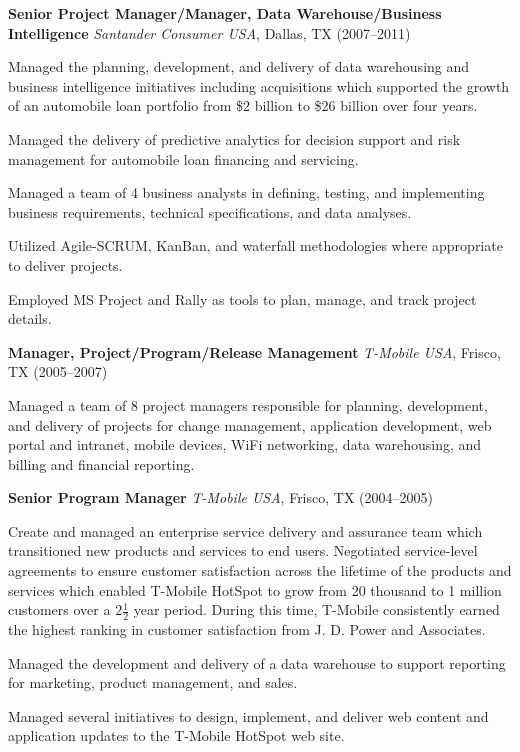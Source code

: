 \documentclass{article}
\newcommand{\sbt}{\,\begin{picture}(-1,1)(-1,-3)\circle*{3}\end{picture}\ }
\begin{document}
\clearpage

\noindent
{\bfseries Senior Project Manager/Manager, Data Warehouse/Business Intelligence} {\itshape Santander Consumer USA}, Dallas, TX (2007--2011)
\begin{compactitem}
\item[\sbt] Managed the planning, development, and delivery of data warehousing and business intelligence initiatives including acquisitions which supported the growth of an automobile loan portfolio from \$2 billion to \$26 billion over four years.
\item[\sbt] Managed the delivery of predictive analytics for decision support and risk management for automobile loan financing and servicing.
\item[\sbt] Managed a team of 4 business analysts in defining, testing, and implementing business requirements, technical specifications, and data analyses.
\item[\sbt] Utilized Agile-SCRUM, KanBan, and waterfall methodologies where appropriate to deliver projects.
\item[\sbt] Employed MS Project and Rally as tools to plan, manage, and track project details.
\end{compactitem}

\noindent
{\bfseries Manager, Project/Program/Release Management} {\itshape T-Mobile USA}, Frisco, TX (2005--2007)
\begin{compactitem}
\item[\sbt] Managed a team of 8 project managers responsible for planning, development, and delivery of projects for change management, application development, web portal and intranet, mobile devices, WiFi networking, data warehousing, and billing and financial reporting.
\end{compactitem}

\noindent
{\bfseries Senior Program Manager} {\itshape T-Mobile USA}, Frisco, TX (2004--2005)
\begin{compactitem}
\item[\sbt] Create and managed an enterprise service delivery and assurance team which transitioned new products and services to end users. Negotiated service-level agreements to ensure customer satisfaction across the lifetime of the products and services which enabled T-Mobile HotSpot to grow from 20 thousand to 1 million customers over a $2 \frac{1}{2}$ year period. During this time, T-Mobile consistently earned the highest ranking in customer satisfaction from J. D. Power and Associates.
\item[\sbt] Managed the development and delivery of a data warehouse to support reporting for marketing, product management, and sales.
\item[\sbt] Managed several initiatives to design, implement, and deliver web content and application updates to the T-Mobile HotSpot web site.
\end{compactitem}
\end{document}
